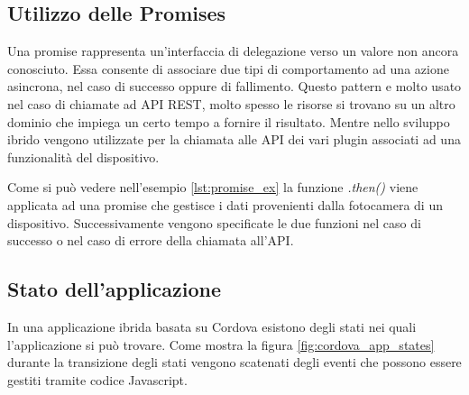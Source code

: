 \subsection{Utilizzo delle Promises}
Una promise rappresenta un'interfaccia di delegazione verso un valore non ancora conosciuto. Essa consente di associare due tipi di comportamento ad una azione asincrona, nel caso di successo oppure di fallimento. \citep{mdn:promise}
Questo pattern e molto usato nel caso di chiamate ad API REST, molto spesso le risorse si trovano su un altro dominio che impiega un certo tempo a fornire il risultato. Mentre nello sviluppo ibrido vengono utilizzate per la chiamata alle API dei vari plugin associati ad una funzionalità del dispositivo.


Come si può vedere nell'esempio \ref{lst:promise_ex} la funzione \emph{.then()} viene applicata ad una promise che gestisce i dati provenienti dalla fotocamera di un dispositivo. Successivamente vengono specificate le due funzioni nel caso di successo o nel caso di errore della chiamata all'API.

\subsection{Stato dell'applicazione}
In una applicazione ibrida basata su Cordova esistono degli stati nei quali l'applicazione si può trovare. Come mostra la figura \ref{fig:cordova_app_states} durante la transizione degli stati vengono scatenati degli eventi che possono essere gestiti tramite codice Javascript.

